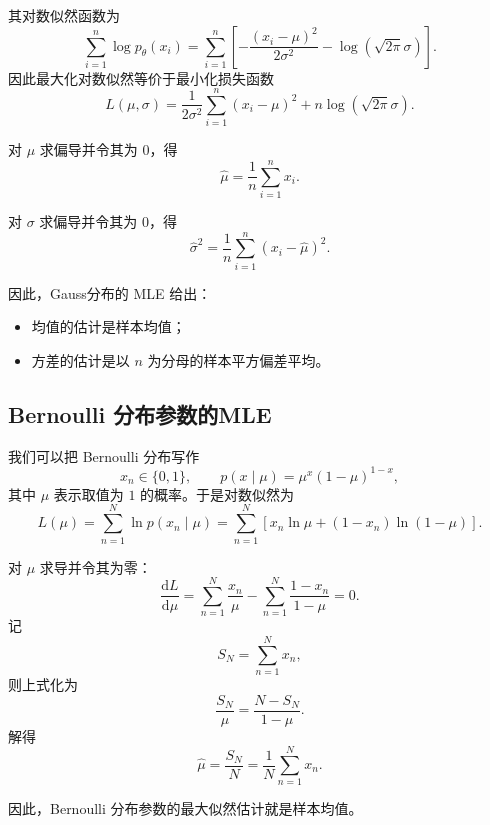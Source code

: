 其对数似然函数为
\[
\sum_{i=1}^n \log p_\theta(x_i)
=
\sum_{i=1}^n
\left[
-\frac{(x_i-\mu)^2}{2\sigma^2}
-\log(\sqrt{2\pi}\sigma)
\right].
\]
因此最大化对数似然等价于最小化损失函数
\[
L(\mu,\sigma)=
\frac{1}{2\sigma^2}\sum_{i=1}^n (x_i-\mu)^2
+n\log(\sqrt{2\pi}\sigma).
\]

对 \(\mu\) 求偏导并令其为 \(0\)，得
\[
\hat{\mu}
=
\frac{1}{n}\sum_{i=1}^n x_i.
\]

对 \(\sigma\) 求偏导并令其为 \(0\)，得
\[
\hat{\sigma}^2
=
\frac{1}{n}\sum_{i=1}^n (x_i-\hat{\mu})^2.
\]

因此，Gauss分布的 MLE 给出：
\begin{itemize}
    \item 均值的估计是样本均值；
    \item 方差的估计是以 \(n\) 为分母的样本平方偏差平均。
\end{itemize}

\subsection{Bernoulli 分布参数的MLE}

我们可以把 Bernoulli 分布写作
\[
x_n\in\{0,1\}, \qquad
p(x\mid \mu)=\mu^x(1-\mu)^{1-x},
\]
其中 $\mu$ 表示取值为 $1$ 的概率。于是对数似然为
\[
L(\mu)
=
\sum_{n=1}^N \ln p(x_n\mid \mu)
=
\sum_{n=1}^N \left[x_n\ln\mu+(1-x_n)\ln(1-\mu)\right].
\]

对 $\mu$ 求导并令其为零：
\[
\frac{\mathrm{d}L}{\mathrm{d}\mu}
=
\sum_{n=1}^N \frac{x_n}{\mu}
-
\sum_{n=1}^N \frac{1-x_n}{1-\mu}
=0.
\]
记
\[
S_N=\sum_{n=1}^N x_n,
\]
则上式化为
\[
\frac{S_N}{\mu}
=
\frac{N-S_N}{1-\mu}.
\]
解得
\[
\hat{\mu}=\frac{S_N}{N}
=
\frac{1}{N}\sum_{n=1}^N x_n.
\]

因此，Bernoulli 分布参数的最大似然估计就是样本均值。